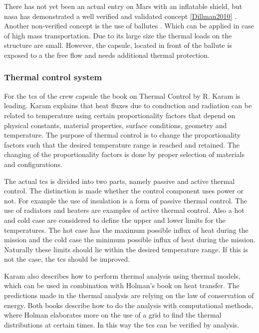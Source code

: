 There has not yet been an actual entry on Mars with an inflatable shield, but \gls{nasa} has demonstrated a well verified and validated concept \ref{Dillman2010} \cite{Dillman2012}. Another non-verified concept is the use of ballutes \cite{Hall2001}. Which can be applied in case of high mass transportation. Due to its large size the thermal loads on the structure are small. However, the capsule, located in front of the ballute is exposed to a the free flow and needs additional thermal protection.

\subsubsection{Thermal control system}
For the \gls{tcs} of the crew capsule the book on Thermal Control by R. Karam is leading. \cite{Karam1998} Karam explains that heat fluxes due to conduction and radiation can be related to temperature using certain proportionality factors that depend on physical constants, material properties, surface conditions, geometry and temperature. The purpose of thermal control is to change the proportionality factors such that the desired temperature range is reached and retained. The changing of the proportionality factors is done by proper selection of materials and configurations.

The actual \gls{tcs} is divided into two parts, namely passive and active thermal control. The distinction is made whether the control component uses power or not. For example the use of insulation is a form of passive thermal control. The use of radiators and heaters are examples of active thermal control. Also a hot and cold case are considered to define the upper and lower limits for the temperatures. The hot case has the maximum possible influx of heat during the mission and the cold case the minimum possible influx of heat during the mission. Naturally these limits should lie within the desired temperature range. If this is not the case, the \gls{tcs} should be improved.

Karam also describes how to perform thermal analysis using thermal models, which can be used in combination with Holman's book on heat transfer. \cite{Holman2002} The predictions made in the thermal analysis are relying on the law of conservation of energy. Both books describe how to do the analysis with computational methods, where Holman elaborates more on the use of a grid to find the thermal distributions at certain times. In this way the \gls{tcs} can be verified by analysis.





